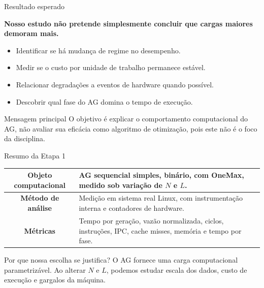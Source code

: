 \documentclass[aspectratio=169,11pt]{beamer}
\begin{document}

\begin{frame}{Resultado esperado}

    \textbf{Nosso estudo não pretende simplesmente concluir que cargas maiores demoram mais.}

    \vspace{0.18cm}

    \begin{itemize}
        \item Identificar se há mudança de regime no desempenho.
        \item Medir se o custo por unidade de trabalho permanece estável.
        \item Relacionar degradações a eventos de hardware quando possível.
        \item Descobrir qual fase do AG domina o tempo de execução.
    \end{itemize}

    \vspace{0.22cm}

    \begin{impactbox}{Mensagem principal}
        O objetivo é explicar o comportamento computacional do AG,
        não avaliar sua eficácia como algoritmo de otimização, pois este não é o foco da disciplina.
    \end{impactbox}

\end{frame}


\begin{frame}{Resumo da Etapa 1}

    \renewcommand{\arraystretch}{1.28}
    \begin{tabularx}{\textwidth}{>{\bfseries}c X}
        Objeto computacional & AG sequencial simples, binário, com OneMax, medido sob variação de $N$ e $L$. \\
        \hline
        Método de análise & Medição em sistema real Linux, com instrumentação interna e contadores de hardware. \\
        \hline
        Métricas & Tempo por geração, vazão normalizada, ciclos, instruções, IPC, cache misses, memória e tempo por fase. \\
    \end{tabularx}

    \vspace{0.30cm}

    \begin{questionbox}{Por que nossa escolha se justifica?}
        O AG fornece uma carga computacional parametrizável. Ao alterar $N$ e $L$,
        podemos estudar escala dos dados, custo de execução e gargalos da máquina.
    \end{questionbox}

\end{frame}
\end{document}
